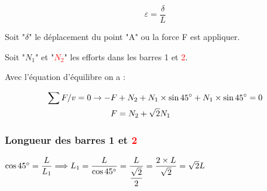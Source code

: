 \documentclass[12pt,a4paper]{report}
\begin{document}
	
	\[ \varepsilon = \dfrac{\delta}{L} \]
	
	Soit "$\delta$" le déplacement du point "A" ou la force F est appliquer.
	
	\vspace{\baselineskip}
	
	Soit "$N_{1}$" et "\textcolor{red}{$N_{2}$}" les efforts dans les barres 1 et \textcolor{red}{2}.
	
	\vspace{\baselineskip}
	
	Avec l'équation d'équilibre on a :
	
	\[ \begin{aligned}
		\sum F/v = 0 \rightarrow -&F + N_{2} + N_{1} \times \sin45\degree + N_{1} \times \sin45\degree = 0 \\
		&F = N_{2} + \sqrt{2}N_{1}
	\end{aligned} \]
	
	
	\vspace{2\baselineskip}
	
	\subsubsection{Longueur des barres 1 et \textcolor{red}{2}}
	
	\vspace{.5\baselineskip}
	
	\begin{minipage}{.3\textwidth}
	\end{minipage}
	\begin{minipage}{.7\textwidth}
		$\cos45\degree = \dfrac{L}{L_{1}} \Longrightarrow L_{1} = \dfrac{L}{\cos45\degree} = \dfrac{L}{\dfrac{\sqrt{2}}{2}} = \dfrac{2 \times L}{\sqrt{2}} = \sqrt{2}L$
		
		
		\vspace{\baselineskip}
		
	\end{minipage}
	
\end{document}
